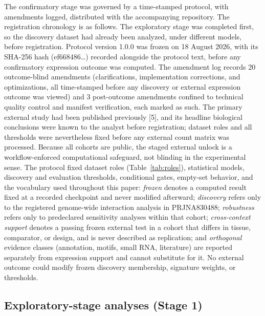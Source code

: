 \documentclass[11pt]{article}
\begin{document}
The confirmatory stage was governed by a time-stamped protocol, with amendments logged, distributed with the accompanying repository. The registration chronology is as follows. The exploratory stage was completed first, so the discovery dataset had already been analyzed, under different models, before registration. Protocol version 1.0.0 was frozen on 18 August 2026, with its SHA-256 hash (ef668486\ldots) recorded alongside the protocol text, before any confirmatory expression outcome was computed. The amendment log records 20 outcome-blind amendments (clarifications, implementation corrections, and optimizations, all time-stamped before any discovery or external expression outcome was viewed) and 3 post-outcome amendments confined to technical quality control and manifest verification, each marked as such. The primary external study had been published previously [5], and its headline biological conclusions were known to the analyst before registration; dataset roles and all thresholds were nevertheless fixed before any external count matrix was processed. Because all cohorts are public, the staged external unlock is a workflow-enforced computational safeguard, not blinding in the experimental sense. The protocol fixed dataset roles (Table~\ref{tab:roles}), statistical models, discovery and evaluation thresholds, conditional gates, empty-set behavior, and the vocabulary used throughout this paper: \emph{frozen} denotes a computed result fixed at a recorded checkpoint and never modified afterward; \emph{discovery} refers only to the registered genome-wide interaction analysis in PRJNA830488; \emph{robustness} refers only to predeclared sensitivity analyses within that cohort; \emph{cross-context support} denotes a passing frozen external test in a cohort that differs in tissue, comparator, or design, and is never described as replication; and \emph{orthogonal} evidence classes (annotation, motifs, small RNA, literature) are reported separately from expression support and cannot substitute for it. No external outcome could modify frozen discovery membership, signature weights, or thresholds.

\subsection{Exploratory-stage analyses (Stage 1)}
\end{document}
